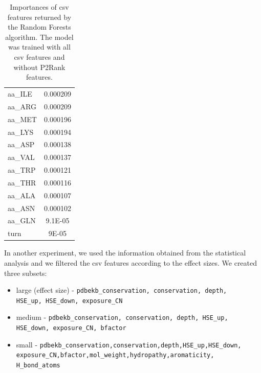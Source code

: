 \begin{table}[]
{\begin{tabular}{@{}lc@{}}
aa\_ILE              & 0.000209            \\
aa\_ARG              & 0.000209            \\
aa\_MET              & 0.000196            \\
aa\_LYS              & 0.000194            \\
aa\_ASP              & 0.000138            \\
aa\_VAL              & 0.000137            \\
aa\_TRP              & 0.000121            \\
aa\_THR              & 0.000116            \\
aa\_ALA              & 0.000107            \\
aa\_ASN              & 0.000102            \\
aa\_GLN              & 9.1E-05             \\
turn                 & 9E-05               \\ \bottomrule
\end{tabular}
}
\caption[Importances of csv features returned by the Random Forests algorithm]{Importances of csv features returned by the Random Forests algorithm. The model was trained with all csv features and without P2Rank features.}
\label{tab:importances}
\end{table}

\newpage
In another experiment, we used the information obtained from the statistical analysis and we filtered the csv features according to the effect sizes. We created three subsets:
\begin{itemize}
\item large (effect size) - \texttt{pdbekb\_conservation, conservation, depth, \\ HSE\_up, HSE\_down, exposure\_CN}
\item medium - \texttt{pdbekb\_conservation, conservation, depth, HSE\_up, \\ HSE\_down, exposure\_CN, bfactor}
\item small - \texttt{pdbekb\_conservation,conservation,depth,HSE\_up,HSE\_down, \\ exposure\_CN,bfactor,mol\_weight,hydropathy,aromaticity, \\ H\_bond\_atoms
}
\end{itemize}

